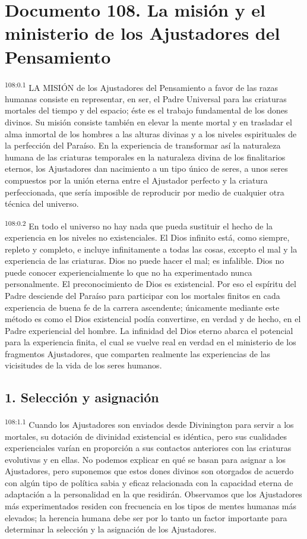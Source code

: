 \chapter{Documento 108. La misión y el ministerio de los Ajustadores del Pensamiento}
\par
\textsuperscript{108:0.1} LA MISIÓN de los Ajustadores del Pensamiento a favor de las razas humanas consiste en representar, en ser, el Padre Universal para las criaturas mortales del tiempo y del espacio; éste es el trabajo fundamental de los dones divinos. Su misión consiste también en elevar la mente mortal y en trasladar el alma inmortal de los hombres a las alturas divinas y a los niveles espirituales de la perfección del Paraíso. En la experiencia de transformar así la naturaleza humana de las criaturas temporales en la naturaleza divina de los finalitarios eternos, los Ajustadores dan nacimiento a un tipo único de seres, a unos seres compuestos por la unión eterna entre el Ajustador perfecto y la criatura perfeccionada, que sería imposible de reproducir por medio de cualquier otra técnica del universo.

\par
\textsuperscript{108:0.2} En todo el universo no hay nada que pueda sustituir el hecho de la experiencia en los niveles no existenciales. El Dios infinito está, como siempre, repleto y completo, e incluye infinitamente a todas las cosas, excepto el mal y la experiencia de las criaturas. Dios no puede hacer el mal; es infalible. Dios no puede conocer experiencialmente lo que no ha experimentado nunca personalmente. El preconocimiento de Dios es existencial. Por eso el espíritu del Padre desciende del Paraíso para participar con los mortales finitos en cada experiencia de buena fe de la carrera ascendente; únicamente mediante este método es como el Dios existencial podía convertirse, en verdad y de hecho, en el Padre experiencial del hombre. La infinidad del Dios eterno abarca el potencial para la experiencia finita, el cual se vuelve real en verdad en el ministerio de los fragmentos Ajustadores, que comparten realmente las experiencias de las vicisitudes de la vida de los seres humanos.

\section*{1. Selección y asignación}
\par
\textsuperscript{108:1.1} Cuando los Ajustadores son enviados desde Divinington para servir a los mortales, su dotación de divinidad existencial es idéntica, pero sus cualidades experienciales varían en proporción a sus contactos anteriores con las criaturas evolutivas y en ellas. No podemos explicar en qué se basan para asignar a los Ajustadores, pero suponemos que estos dones divinos son otorgados de acuerdo con algún tipo de política sabia y eficaz relacionada con la capacidad eterna de adaptación a la personalidad en la que residirán. Observamos que los Ajustadores más experimentados residen con frecuencia en los tipos de mentes humanas más elevados; la herencia humana debe ser por lo tanto un factor importante para determinar la selección y la asignación de los Ajustadores.

